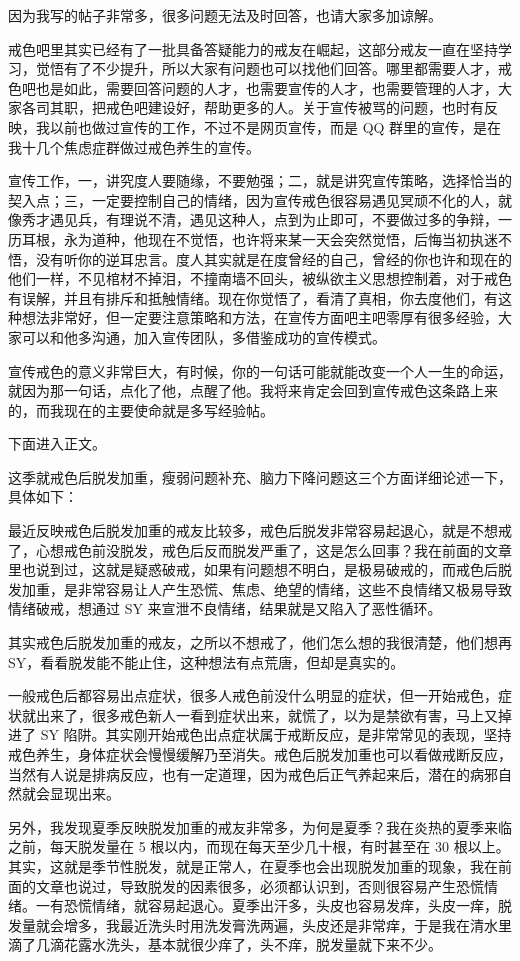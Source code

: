 \documentclass[fontset=founder]{ctexart}
\begin{document}
因为我写的帖子非常多，很多问题无法及时回答，也请大家多加谅解。

戒色吧里其实已经有了一批具备答疑能力的戒友在崛起，这部分戒友一直在坚持学习，觉悟有了不少提升，所以大家有问题也可以找他们回答。哪里都需要人才，戒色吧也是如此，需要回答问题的人才，也需要宣传的人才，也需要管理的人才，大家各司其职，把戒色吧建设好，帮助更多的人。关于宣传被骂的问题，也时有反映，我以前也做过宣传的工作，不过不是网页宣传，而是 QQ 群里的宣传，是在我十几个焦虑症群做过戒色养生的宣传。

宣传工作，一，讲究度人要随缘，不要勉强；二，就是讲究宣传策略，选择恰当的契入点；三，一定要控制自己的情绪，因为宣传戒色很容易遇见冥顽不化的人，就像秀才遇见兵，有理说不清，遇见这种人，点到为止即可，不要做过多的争辩，一历耳根，永为道种，他现在不觉悟，也许将来某一天会突然觉悟，后悔当初执迷不悟，没有听你的逆耳忠言。度人其实就是在度曾经的自己，曾经的你也许和现在的他们一样，不见棺材不掉泪，不撞南墙不回头，被纵欲主义思想控制着，对于戒色有误解，并且有排斥和抵触情绪。现在你觉悟了，看清了真相，你去度他们，有这种想法非常好，但一定要注意策略和方法，在宣传方面吧主吧零厚有很多经验，大家可以和他多沟通，加入宣传团队，多借鉴成功的宣传模式。

宣传戒色的意义非常巨大，有时候，你的一句话可能就能改变一个人一生的命运，就因为那一句话，点化了他，点醒了他。我将来肯定会回到宣传戒色这条路上来的，而我现在的主要使命就是多写经验帖。

下面进入正文。

这季就戒色后脱发加重，瘦弱问题补充、脑力下降问题这三个方面详细论述一下，具体如下：

最近反映戒色后脱发加重的戒友比较多，戒色后脱发非常容易起退心，就是不想戒了，心想戒色前没脱发，戒色后反而脱发严重了，这是怎么回事？我在前面的文章里也说到过，这就是疑惑破戒，如果有问题想不明白，是极易破戒的，而戒色后脱发加重，是非常容易让人产生恐慌、焦虑、绝望的情绪，这些不良情绪又极易导致情绪破戒，想通过 SY 来宣泄不良情绪，结果就是又陷入了恶性循环。

其实戒色后脱发加重的戒友，之所以不想戒了，他们怎么想的我很清楚，他们想再 SY，看看脱发能不能止住，这种想法有点荒唐，但却是真实的。

一般戒色后都容易出点症状，很多人戒色前没什么明显的症状，但一开始戒色，症状就出来了，很多戒色新人一看到症状出来，就慌了，以为是禁欲有害，马上又掉进了 SY 陷阱。其实刚开始戒色出点症状属于戒断反应，是非常常见的表现，坚持戒色养生，身体症状会慢慢缓解乃至消失。戒色后脱发加重也可以看做戒断反应，当然有人说是排病反应，也有一定道理，因为戒色后正气养起来后，潜在的病邪自然就会显现出来。

另外，我发现夏季反映脱发加重的戒友非常多，为何是夏季？我在炎热的夏季来临之前，每天脱发量在 5 根以内，而现在每天至少几十根，有时甚至在 30 根以上。其实，这就是季节性脱发，就是正常人，在夏季也会出现脱发加重的现象，我在前面的文章也说过，导致脱发的因素很多，必须都认识到，否则很容易产生恐慌情绪。一有恐慌情绪，就容易起退心。夏季出汗多，头皮也容易发痒，头皮一痒，脱发量就会增多，我最近洗头时用洗发膏洗两遍，头皮还是非常痒，于是我在清水里滴了几滴花露水洗头，基本就很少痒了，头不痒，脱发量就下来不少。
\end{document}
